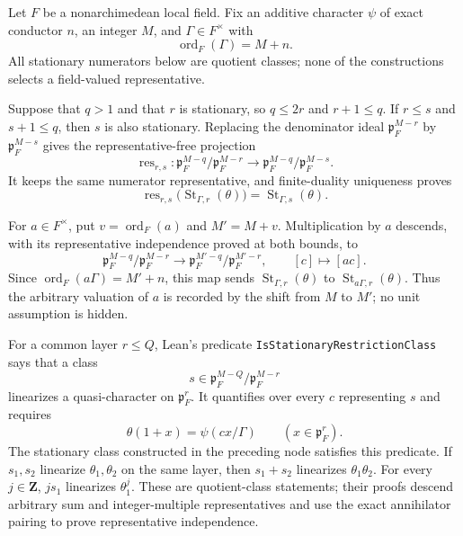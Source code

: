 \begin{lemma}\label{mod:lamprecht-stationaryclasscalculus}
Let $F$ be a nonarchimedean local field.  Fix an additive character
$\psi$ of exact conductor $n$, an integer $M$, and
$\Gamma\in F^\times$ with
\[
 \operatorname{ord}_F(\Gamma)=M+n.
\]
All stationary numerators below are quotient classes; none of the
constructions selects a field-valued representative.

Suppose that $q>1$ and that $r$ is stationary, so
$q\leq2r$ and $r+1\leq q$.  If
$r\leq s$ and $s+1\leq q$, then $s$ is also stationary.  Replacing the
denominator ideal $\mathfrak p_F^{M-r}$ by
$\mathfrak p_F^{M-s}$ gives the representative-free projection
\[
 \operatorname{res}_{r,s}\colon
 \mathfrak p_F^{M-q}/\mathfrak p_F^{M-r}
 \longrightarrow
 \mathfrak p_F^{M-q}/\mathfrak p_F^{M-s}.
\]
It keeps the same numerator representative, and finite-duality uniqueness
proves
\[
 \operatorname{res}_{r,s}
   \bigl(\operatorname{St}_{\Gamma,r}(\theta)\bigr)
 =\operatorname{St}_{\Gamma,s}(\theta).
\]

For $a\in F^\times$, put $v=\operatorname{ord}_F(a)$ and
$M'=M+v$.  Multiplication by $a$ descends, with its representative
independence proved at both bounds, to
\[
 \mathfrak p_F^{M-q}/\mathfrak p_F^{M-r}
 \longrightarrow
 \mathfrak p_F^{M'-q}/\mathfrak p_F^{M'-r},
 \qquad[c]\longmapsto[ac].
\]
Since $\operatorname{ord}_F(a\Gamma)=M'+n$, this map sends
$\operatorname{St}_{\Gamma,r}(\theta)$ to
$\operatorname{St}_{a\Gamma,r}(\theta)$.  Thus the arbitrary valuation of
$a$ is recorded by the shift from $M$ to $M'$; no unit assumption is hidden.

For a common layer $r\leq Q$, Lean's predicate
\texttt{IsStationaryRestrictionClass} says that a class
\[
 s\in\mathfrak p_F^{M-Q}/\mathfrak p_F^{M-r}
\]
linearizes a quasi-character on $\mathfrak p_F^r$.  It quantifies over every
$c$ representing $s$ and requires
\[
 \theta(1+x)=\psi(cx/\Gamma)
 \qquad(x\in\mathfrak p_F^r).
\]
The stationary class constructed in the preceding node satisfies this
predicate.  If $s_1,s_2$ linearize $\theta_1,\theta_2$ on the same layer,
then $s_1+s_2$ linearizes $\theta_1\theta_2$.  For every $j\in\mathbf Z$,
$j s_1$ linearizes $\theta_1^j$.  These are quotient-class statements;
their proofs descend arbitrary sum and integer-multiple representatives and
use the exact annihilator pairing to prove representative independence.


\end{lemma}
